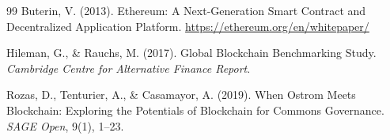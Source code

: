 \documentclass[a4paper,12pt]{article}
\theoremstyle{definition}
\begin{document}
\begin{thebibliography}{99}
Buterin, V. (2013).
\newblock Ethereum: A Next-Generation Smart Contract and Decentralized Application Platform.
\newblock \url{https://ethereum.org/en/whitepaper/}

Hileman, G., \& Rauchs, M. (2017).
\newblock Global Blockchain Benchmarking Study.
\newblock \emph{Cambridge Centre for Alternative Finance Report}.

Rozas, D., Tenturier, A., \& Casamayor, A. (2019).
\newblock When Ostrom Meets Blockchain: Exploring the Potentials of Blockchain for Commons Governance.
\newblock \emph{SAGE Open}, 9(1), 1--23.

\end{thebibliography}
\end{document}
